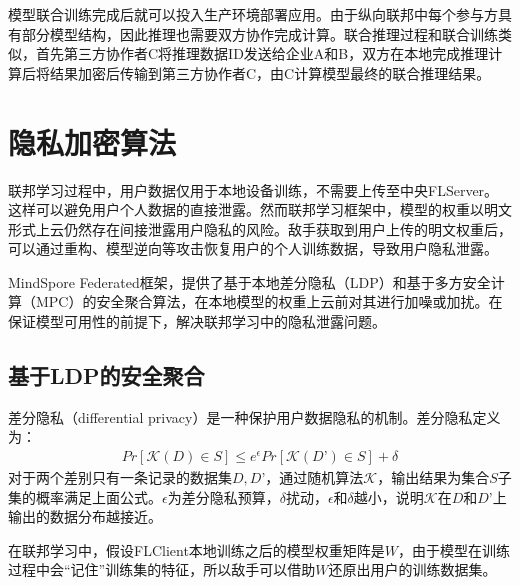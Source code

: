 \documentclass[letterpaper,10pt,english]{sphinxmanual}
\begin{document}
\sphinxAtStartPar
模型联合训练完成后就可以投入生产环境部署应用。由于纵向联邦中每个参与方具有部分模型结构，因此推理也需要双方协作完成计算。联合推理过程和联合训练类似，首先第三方协作者C将推理数据ID发送给企业A和B，双方在本地完成推理计算后将结果加密后传输到第三方协作者C，由C计算模型最终的联合推理结果。


\section{隐私加密算法}
\label{\detokenize{chapter_federated_learning/privacy_encryption_algorithm:id1}}\label{\detokenize{chapter_federated_learning/privacy_encryption_algorithm::doc}}
\sphinxAtStartPar
联邦学习过程中，用户数据仅用于本地设备训练，不需要上传至中央FL\sphinxhyphen{}Server。这样可以避免用户个人数据的直接泄露。然而联邦学习框架中，模型的权重以明文形式上云仍然存在间接泄露用户隐私的风险。敌手获取到用户上传的明文权重后，可以通过重构、模型逆向等攻击恢复用户的个人训练数据，导致用户隐私泄露。

\sphinxAtStartPar
MindSpore
Federated框架，提供了基于本地差分隐私（LDP）和基于多方安全计算（MPC）的安全聚合算法，在本地模型的权重上云前对其进行加噪或加扰。在保证模型可用性的前提下，解决联邦学习中的隐私泄露问题。


\subsection{基于LDP的安全聚合}
\label{\detokenize{chapter_federated_learning/privacy_encryption_algorithm:ldp}}
\sphinxAtStartPar
差分隐私（differential
privacy）是一种保护用户数据隐私的机制。差分隐私定义为：
\begin{equation}\label{equation:chapter_federated_learning/privacy_encryption_algorithm:chapter_federated_learning/privacy_encryption_algorithm:0}
\begin{split}Pr[\mathcal{K}(D)\in S] \le e^{\epsilon} Pr[\mathcal{K}(D’) \in S]+\delta\end{split}
\end{equation}
\sphinxAtStartPar
对于两个差别只有一条记录的数据集\(D, D’\)，通过随机算法\(\mathcal{K}\)，输出结果为集合\(S\)子集的概率满足上面公式。\(\epsilon\)为差分隐私预算，\(\delta\)扰动，\(\epsilon\)和\(\delta\)越小，说明\(\mathcal{K}\)在\(D\)和\(D’\)上输出的数据分布越接近。

\sphinxAtStartPar
在联邦学习中，假设FL\sphinxhyphen{}Client本地训练之后的模型权重矩阵是\(W\)，由于模型在训练过程中会“记住”训练集的特征，所以敌手可以借助\(W\)还原出用户的训练数据集。
\end{document}
